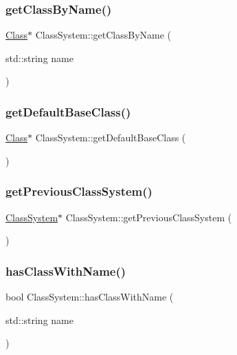 \subsubsection{\texorpdfstring{get\+Class\+By\+Name()}{getClassByName()}}
{\footnotesize\ttfamily \hyperlink{classClass}{Class}$\ast$ Class\+System\+::get\+Class\+By\+Name (\begin{DoxyParamCaption}\item[{std\+::string}]{name }\end{DoxyParamCaption})}

\mbox{\label{classClassSystem_add1ff8eadba3826024e68c836af28250}} 
\subsubsection{\texorpdfstring{get\+Default\+Base\+Class()}{getDefaultBaseClass()}}
{\footnotesize\ttfamily \hyperlink{classClass}{Class}$\ast$ Class\+System\+::get\+Default\+Base\+Class (\begin{DoxyParamCaption}{ }\end{DoxyParamCaption})}

\mbox{\label{classClassSystem_a32c4883e03da6a11ab11f2f39afc073a}} 
\subsubsection{\texorpdfstring{get\+Previous\+Class\+System()}{getPreviousClassSystem()}}
{\footnotesize\ttfamily \hyperlink{classClassSystem}{Class\+System}$\ast$ Class\+System\+::get\+Previous\+Class\+System (\begin{DoxyParamCaption}{ }\end{DoxyParamCaption})}

\mbox{\label{classClassSystem_aa3e6fdac5739091d3f48dbe2b8c9db46}} 
\subsubsection{\texorpdfstring{has\+Class\+With\+Name()}{hasClassWithName()}}
{\footnotesize\ttfamily bool Class\+System\+::has\+Class\+With\+Name (\begin{DoxyParamCaption}\item[{std\+::string}]{name }\end{DoxyParamCaption})}

